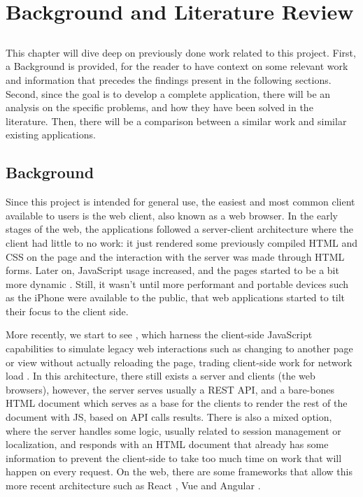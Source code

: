 \chapter{Background and Literature Review} \label{chap:sota}

\section*{}

This chapter will dive deep on previously done work related to this project. First, a Background is provided, for the reader to have context on some relevant work and information that precedes the findings present in the following sections. Second, since the goal is to develop a complete application, there will be an analysis on the specific problems, and how they have been solved in the literature. Then, there will be a comparison between a similar work and similar existing applications.

\section{Background}

Since this project is intended for general use, the easiest and most common client available to users is the web client, also known as a web browser. In the early stages of the web, the applications followed a server-client architecture where the client had little to no work: it just rendered some previously compiled HTML and CSS on the page and the interaction with the server was made through HTML forms. Later on, JavaScript usage increased, and the pages started to be a bit more dynamic \cite{ShklarRosen09}. Still, it wasn't until more performant and portable devices such as the iPhone were available to the public, that web applications started to tilt their focus to the client side. 

More recently, we start to see , which harness the client-side JavaScript capabilities to simulate legacy web interactions such as changing to another page or view without actually reloading the page, trading client-side work for network load \cite{Lugo-Cordero2015} \cite{Derezinska2020} \cite{Mesbah2007} \cite{Mesbah2007a}. In this architecture, there still exists a server and clients (the web browsers), however, the server serves usually a REST API, and a bare-bones HTML document which serves as a base for the clients to render the rest of the document with JS, based on API calls results. There is also a mixed option, where the server handles some logic, usually related to session management or localization, and responds with an HTML document that already has some information to prevent the client-side to take too much time on work that will happen on every request. On the web, there are some frameworks that allow this more recent architecture such as React \cite{React}, Vue \cite{Vue} and Angular \cite{Angular}.

